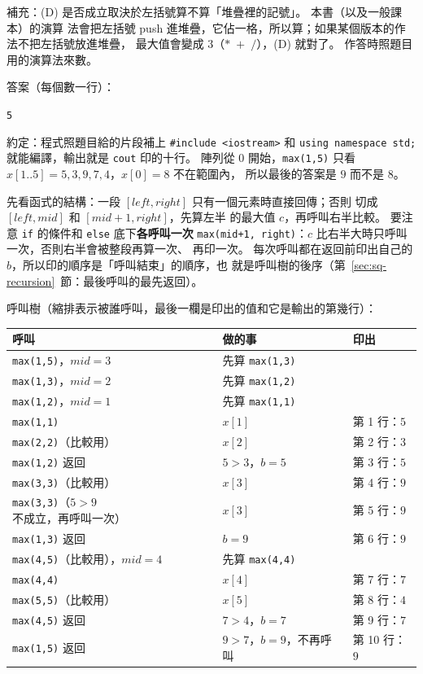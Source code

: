 補充：(D) 是否成立取決於左括號算不算「堆疊裡的記號」。 本書（以及一般課本）的演算
法會把左括號 push 進堆疊，它佔一格，所以算；如果某個版本的作法不把左括號放進堆疊，
最大值會變成 $3$（$*\;+\;/$），(D) 就對了。 作答時照題目用的演算法來數。

答案（每個數一行）：
\begin{center}
\texttt{5         }
\end{center}

約定：程式照題目給的片段補上 \texttt{\#include <iostream>} 和
\texttt{using namespace std;} 就能編譯，輸出就是 \texttt{cout} 印的十行。 陣列從
$0$ 開始，\texttt{max(1,5)} 只看 $x[1..5] = 5, 3, 9, 7, 4$，$x[0] = 8$ 不在範圍內，
所以最後的答案是 $9$ 而不是 $8$。

先看函式的結構：一段 $[\mathit{left}, \mathit{right}]$ 只有一個元素時直接回傳；否則
切成 $[\mathit{left}, \mathit{mid}]$ 和 $[\mathit{mid} + 1, \mathit{right}]$，先算左半
的最大值 $c$，再呼叫右半比較。 要注意 \texttt{if} 的條件和 \texttt{else} 底下\textbf{各呼叫一次}
\texttt{max(mid+1, right)}：$c$ 比右半大時只呼叫一次，否則右半會被整段再算一次、
再印一次。 每次呼叫都在返回前印出自己的 $b$，所以印的順序是「呼叫結束」的順序，也
就是呼叫樹的後序（第~\ref{sec:sq-recursion}~節：最後呼叫的最先返回）。

呼叫樹（縮排表示被誰呼叫，最後一欄是印出的值和它是輸出的第幾行）：
\begin{center}
\small
\begin{tabular}{lll}
\toprule
呼叫 & 做的事 & 印出 \\
\midrule
\texttt{max(1,5)}，$\mathit{mid} = 3$ & 先算 \texttt{max(1,3)} & \\
\quad \texttt{max(1,3)}，$\mathit{mid} = 2$ & 先算 \texttt{max(1,2)} & \\
\qquad \texttt{max(1,2)}，$\mathit{mid} = 1$ & 先算 \texttt{max(1,1)} & \\
\qquad\quad \texttt{max(1,1)} & $x[1]$ & 第 1 行：$5$ \\
\qquad\quad \texttt{max(2,2)}（比較用）& $x[2]$ & 第 2 行：$3$ \\
\qquad \texttt{max(1,2)} 返回 & $5 > 3$，$b = 5$ & 第 3 行：$5$ \\
\quad\quad \texttt{max(3,3)}（比較用）& $x[3]$ & 第 4 行：$9$ \\
\quad\quad \texttt{max(3,3)}（$5 > 9$ 不成立，再呼叫一次）& $x[3]$ & 第 5 行：$9$ \\
\quad \texttt{max(1,3)} 返回 & $b = 9$ & 第 6 行：$9$ \\
\quad \texttt{max(4,5)}（比較用），$\mathit{mid} = 4$ & 先算 \texttt{max(4,4)} & \\
\qquad \texttt{max(4,4)} & $x[4]$ & 第 7 行：$7$ \\
\qquad \texttt{max(5,5)}（比較用）& $x[5]$ & 第 8 行：$4$ \\
\quad \texttt{max(4,5)} 返回 & $7 > 4$，$b = 7$ & 第 9 行：$7$ \\
\texttt{max(1,5)} 返回 & $9 > 7$，$b = 9$，不再呼叫 & 第 10 行：$9$ \\
\bottomrule
\end{tabular}
\end{center}

